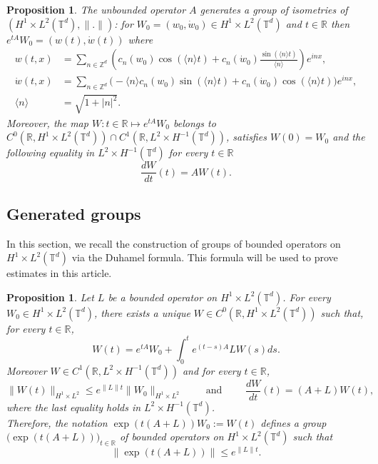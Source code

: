 \documentclass[a4paper]{article}
\theoremstyle{plain}
\newtheorem{proposition}[theorem]{Proposition}
\newcommand{\T}{\mathbb{T}}
\newcommand{\R}{\mathbb{R}}
\begin{document}
\begin{proposition} \label{Lem:A}
The unbounded operator $A$ generates a group of isometries of 
$\left( H^1 \times L^2(\T^d) , \|.\| \right)$: for $W_0=(w_0,\dot{w}_0) \in H^1 \times L^2(\T^d)$ and $t \in \R$ then $e^{tA}W_0 = (w(t),\dot{w}(t))$ where
\begin{equation} \label{SG:w1w2}
\begin{aligned}
w(t,x) & =\sum_{n\in\mathbb{Z}^d} \left( c_n(w_0) \cos(\langle n \rangle t) + c_n(\dot{w}_0) \frac{\sin(\langle n \rangle t)}{\langle n \rangle}  \right) e^{inx},
\\
\dot{w}(t,x) & =\sum_{n\in\mathbb{Z}^d} \Big( - \langle n \rangle c_n(w_0) \sin(\langle n \rangle t) + c_n(\dot{w}_0) \cos(\langle n \rangle t) \Big) e^{inx},
\\
\langle n \rangle & = \sqrt{1+|n|^2} .
\end{aligned}
\end{equation}
Moreover, the map $W:t \in \R \mapsto e^{tA} W_0$ belongs to $C^0(\R,H^1\times L^2(\T^d)) \cap C^1(\R,L^2\times H^{-1}(\T^d))$, satisfies $W(0)=W_0$ and the following equality in $L^2 \times H^{-1}(\T^d)$ for every $t \in \R$ 
$$ \frac{d W}{dt} (t) = A W(t). $$
\end{proposition}



\subsection{Generated groups}

In this section, we recall the construction of groups of bounded operators on $H^1 \times L^2(\T^d)$ via the Duhamel formula. This formula will be used to prove estimates in this article.

\begin{proposition} \label{Lem:A+L}
Let $L$ be a bounded operator on $H^1 \times L^2(\T^d)$. 
For every $W_0 \in H^1 \times L^2(\T^d)$, there exists a unique  
$W \in C^0(\R,H^1 \times L^2(\T^d))$ such that, for every $t \in \R$,
$$W(t)=e^{tA}W_0 + \int_0^t e^{(t-s)A} L W(s) ds.$$
Moreover $W \in  C^1(\R,L^2 \times H^{-1}(\T^d))$ and for every $t \in \R$,
$$\| W(t) \|_{H^1 \times L^2} \leq e^{\|L\|t} \|W_0\|_{H^1 \times L^2}
\qquad \text{ and } \qquad
\frac{dW}{dt}(t)=(A+L)W(t),$$
where the last equality holds in $L^2 \times H^{-1}(\T^d)$. 
\\
Therefore, the notation $\exp(t(A+L))W_0 := W(t)$ defines a group
$\big(\exp(t(A+L))\big)_{t\in\R}$ of bounded operators on $H^1 \times L^2(\T^d)$ such that
$$\| \exp(t(A+L)) \| \leq e^{\|L\|t}.$$
\end{proposition}
\end{document}
